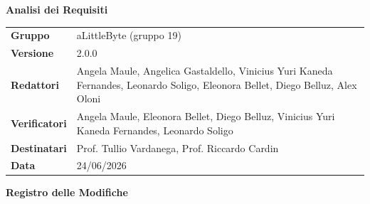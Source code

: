 ﻿\documentclass[a4paper,12pt]{article}
\begin{document}
\thispagestyle{firstpage}

\vspace*{0.5cm}

\begin{center}
    {\LARGE \textbf{Analisi dei Requisiti}}
\end{center}

\vspace{1.5cm}

\begin{center}
    \renewcommand{\arraystretch}{1.3}
    \begin{tcolorbox}[
        width=0.92\textwidth,
        colback=gray!6,
        colframe=gray!45,
        boxrule=0.5pt,
        arc=2mm,
        boxsep=0pt,
        left=8pt, right=8pt, top=8pt, bottom=8pt
    ]
        \begin{tabularx}{\linewidth}{>{\bfseries}p{3.5cm} X}
            Gruppo      & aLittleByte (gruppo 19) \\
            Versione    & 2.0.0 \\
            Redattori   & Angela Maule, Angelica Gastaldello, Vinicius Yuri Kaneda Fernandes, Leonardo Soligo, Eleonora Bellet, Diego Belluz, Alex Oloni\\
            Verificatori & Angela Maule, Eleonora Bellet, Diego Belluz, Vinicius Yuri Kaneda Fernandes, Leonardo Soligo\\
            Destinatari & Prof. Tullio Vardanega, Prof. Riccardo Cardin \\
            Data        & 24/06/2026\\
        \end{tabularx}
    \end{tcolorbox}
\end{center}



\begin{center}
    {\Large \textbf{Registro delle Modifiche}}
\end{center}

\vspace{0.35cm}
\end{document}
